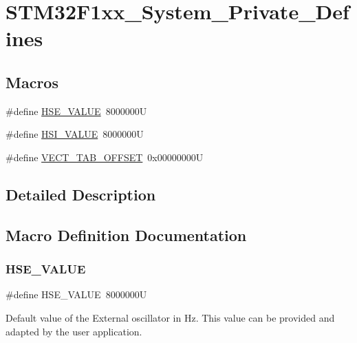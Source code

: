 \hypertarget{group___s_t_m32_f1xx___system___private___defines}{}\section{S\+T\+M32\+F1xx\+\_\+\+System\+\_\+\+Private\+\_\+\+Defines}
\label{group___s_t_m32_f1xx___system___private___defines}
\subsection*{Macros}
\begin{DoxyCompactItemize}
\item 
\#define \mbox{\hyperlink{group___s_t_m32_f1xx___system___private___defines_gaeafcff4f57440c60e64812dddd13e7cb}{H\+S\+E\+\_\+\+V\+A\+L\+UE}}~8000000U
\item 
\#define \mbox{\hyperlink{group___s_t_m32_f1xx___system___private___defines_gaaa8c76e274d0f6dd2cefb5d0b17fbc37}{H\+S\+I\+\_\+\+V\+A\+L\+UE}}~8000000U
\item 
\#define \mbox{\hyperlink{group___s_t_m32_f1xx___system___private___defines_ga40e1495541cbb4acbe3f1819bd87a9fe}{V\+E\+C\+T\+\_\+\+T\+A\+B\+\_\+\+O\+F\+F\+S\+ET}}~0x00000000U
\end{DoxyCompactItemize}


\subsection{Detailed Description}


\subsection{Macro Definition Documentation}
\mbox{\label{group___s_t_m32_f1xx___system___private___defines_gaeafcff4f57440c60e64812dddd13e7cb}} 
\subsubsection{\texorpdfstring{HSE\_VALUE}{HSE\_VALUE}}
{\footnotesize\ttfamily \#define H\+S\+E\+\_\+\+V\+A\+L\+UE~8000000U}

Default value of the External oscillator in Hz. This value can be provided and adapted by the user application. \mbox{\label{group___s_t_m32_f1xx___system___private___defines_gaaa8c76e274d0f6dd2cefb5d0b17fbc37}} 
